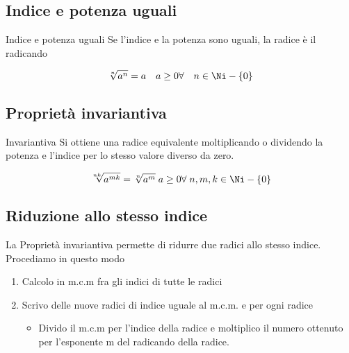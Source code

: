 \subsection{Indice e potenza uguali}
\begin{proprietat}{Indice e potenza uguali}{}
	Se l'indice e la potenza sono uguali, la radice è il radicando
\end{proprietat}
\[\sqrt[n]{a^n}=a\quad a\geq 0\forall\quad n\in\Ni-\lbrace 0\rbrace \]
\subsection{Proprietà invariantiva}
\label{Sec:Propinvariantivaradicali}
\begin{proprietat}{Invariantiva}{}
Si ottiene una radice equivalente moltiplicando o dividendo la potenza e l'indice per lo stesso valore diverso da zero.
\end{proprietat}
\[\sqrt[nk]{a^{mk}}=\sqrt[n]{a^m}\;  a\geq 0\forall\; n,m,k\in\Ni-\lbrace 0\rbrace\]
\subsection{Riduzione allo stesso indice}
\label{sec:RiduzioneAlloStessoIndice}

La Proprietà invariantiva permette di ridurre due radici allo stesso indice. Procediamo in questo modo
\begin{enumerate}
	\item Calcolo in m.c.m fra gli indici di tutte le radici
	\item Scrivo delle nuove radici di indice uguale al m.c.m. e per ogni radice
	\begin{itemize}
	\item Divido il m.c.m per l'indice  della radice e moltiplico il numero ottenuto per l'esponente m del radicando della  radice.
	\end{itemize}
\end{enumerate}

